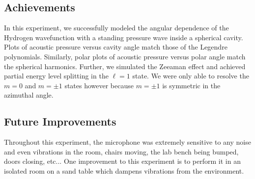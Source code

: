 \documentclass[12pt]{article}
\begin{document}
	\subsection{Achievements}
	In this experiment, we successfully modeled the angular dependence of the Hydrogen wavefunction with a standing pressure wave inside a spherical cavity. Plots of acoustic pressure versus cavity angle match those of the Legendre polynomials. Similarly, polar plots of acoustic pressure versus polar angle match the spherical harmonics. Further, we simulated the Zeeaman effect and achieved partial energy level splitting in the $\ell=1$ state. We were only able to resolve the $m=0$ and $m=\pm1$ states however because $m=\pm1$ is symmetric in the azimuthal angle.

	\subsection{Future Improvements}
	Throughout this experiment, the microphone was extremely sensitive to any noise and even vibrations in the room, chairs moving, the lab bench being bumped, doors closing, etc... One improvement to this experiment is to perform it in an isolated room on a sand table which dampens vibrations from the environment.
	


\newpage

\nocite{*} %

\end{document}
